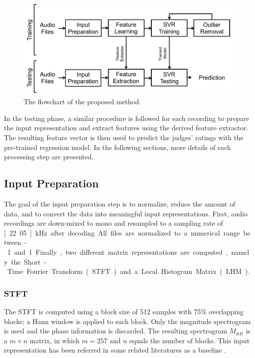 \documentclass[conference]{IEEEtran}
\begin{document}
\begin{figure}
\centering
\includegraphics[width = 8 cm]{./figs/flowchart.pdf}
\caption{The flowchart of the proposed method.}
\label{fig:flowchart}
\end{figure}

In the testing phase, a similar procedure is followed for each recording to prepare the input representation and extract features using the derived feature extractor. The resulting feature vector is then used to predict the judges' ratings with the pre-trained regression model. In the following sections, more details of each processing step are presented. 

\subsection{Input Preparation}\label{subsec:input}
The goal of the input preparation step is to normalize, reduce the amount of data, and to convert the data into meaningful input representations. First, audio recordings are down-mixed to mono and resampled to a sampling rate of \unit[22.05]{kHz} after decoding. All files are normalized to a numerical range between -1 and 1. Finally, two different matrix representations are computed, namely the Short-Time Fourier Transform (STFT) and a Local Histogram Matrix (LHM). 

\subsubsection{STFT}\label{subsec:stft}
The STFT is computed using a block size of 512 samples with 75\% overlapping blocks; a Hann window is applied to each block. Only the magnitude spectrogram is used and the phase information is discarded. The resulting spectrogram $M_\mathrm{stft}$ is a $m \times n$ matrix, in which $m = 257$ and $n$ equals the number of blocks. This input representation has been referred in some related literatures as a baseline \cite{Su2014Guitar, Su2014Violin}. %
\end{document}
